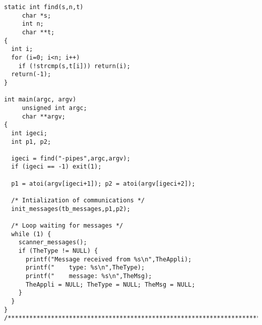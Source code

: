 \documentclass[11pt]{article}
\begin{document}
\begin{verbatim}
static int find(s,n,t)
     char *s;
     int n;
     char **t;
{
  int i;
  for (i=0; i<n; i++)
    if (!strcmp(s,t[i])) return(i);
  return(-1);
}

int main(argc, argv)
     unsigned int argc;
     char **argv;
{
  int igeci;
  int p1, p2;

  igeci = find("-pipes",argc,argv);
  if (igeci == -1) exit(1);

  p1 = atoi(argv[igeci+1]); p2 = atoi(argv[igeci+2]);

  /* Intialization of communications */
  init_messages(tb_messages,p1,p2);

  /* Loop waiting for messages */
  while (1) {
    scanner_messages();
    if (TheType != NULL) {
      printf("Message received from %s\n",TheAppli);
      printf("    type: %s\n",TheType);
      printf("    message: %s\n",TheMsg);
      TheAppli = NULL; TheType = NULL; TheMsg = NULL;
    }
  }
}
/***************************************************************************/
\end{verbatim}
\newpage
\tableofcontents
\end{document}
